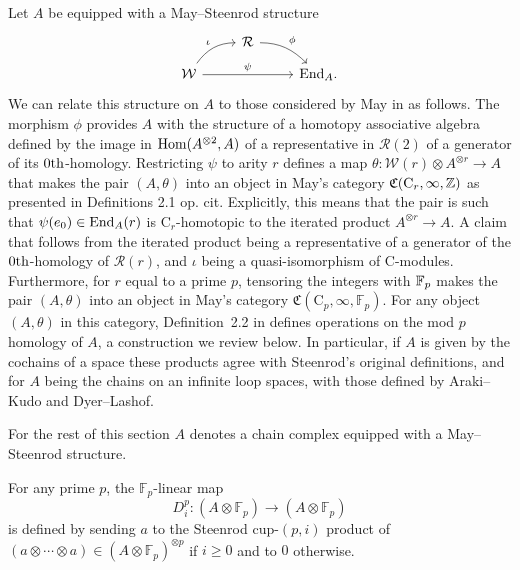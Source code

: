 Let $A$ be equipped with a May--Steenrod structure
\begin{equation*}
\begin{tikzcd}[column sep = normal, row sep = small]
& \mathcal R \arrow[dr, "\phi", out=0] & \\
\mathcal W \arrow[ur, "\iota", out=55, in=180] \arrow[rr, "\psi"] & & \End_A.
\end{tikzcd}
\end{equation*}
We can relate this structure on $A$ to those considered by May in \cite{may1970general} as follows.
The morphism $\phi$ provides $A$ with the structure of a homotopy associative algebra defined by the image in $\mathrm{Hom}(A^{\otimes 2}, A)$ of a representative in $\mathcal R(2)$ of a generator of its $0\mathrm{th}$-homology.
Restricting $\psi$ to arity $r$ defines a map $\theta \colon \mathcal W(r) \otimes A^{\otimes r} \to A$ that makes the pair $(A, \theta)$ into an object in May's category $\mathfrak{C}(\mathrm C_r, \infty, \mathbb{Z})$ as presented in Definitions 2.1 op. cit.
Explicitly, this means that the pair is such that $\psi(e_0) \in \mathrm{End}_A(r)$ is $\mathrm C_r$-homotopic to the iterated product $A^{\otimes r} \to A$.
A claim that follows from the iterated product being a representative of a generator of the $0\mathrm{th}$-homology of $\mathcal R(r)$, and $\iota$ being a quasi-isomorphism of $\mathrm C$-modules.
Furthermore, for $r$ equal to a prime $p$, tensoring the integers with ${\mathbb{F}_p}$ makes the pair $(A, \theta)$ into an object in May's category $\mathfrak{C}(\mathrm C_p, \infty, \mathbb{F}_p)$.
For any object $(A, \theta)$ in this category, Definition~2.2 in \cite{may1970general} defines operations on the mod $p$ homology of $A$, a construction we review below.
In particular, if $A$ is given by the cochains of a space these products agree with Steenrod's original definitions, and for $A$ being the chains on an infinite loop spaces, with those defined by Araki--Kudo and Dyer--Lashof.

For the rest of this section $A$ denotes a chain complex equipped with a May--Steenrod structure.

\begin{definition}
	For any prime $p$, the $\mathbb{F}_p$-linear map
	\begin{equation*}
	D^p_i \colon (A \otimes \mathbb{F}_p) \to (A \otimes \mathbb{F}_p)
	\end{equation*}
	is defined by sending $a$ to the Steenrod cup-$(p, i)$ product of $(a \otimes \cdots \otimes a) \in (A \otimes \mathbb{F}_p)^{\otimes p}$ if $i \geq 0$ and to $0$ otherwise.
\end{definition}

